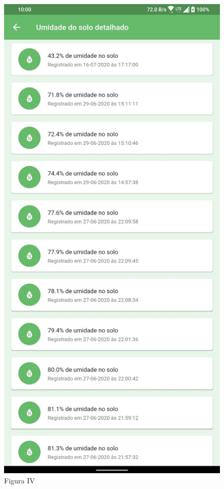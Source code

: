 \documentclass[eso]{bcc}
\begin{document}
\begin{figure}[htbp]
\centerline{\includegraphics[scale=.25]{Figuras/figura-iv.jpg}}
\caption{Figura IV}\label{fig-iv}
\end{figure}
\end{document}
